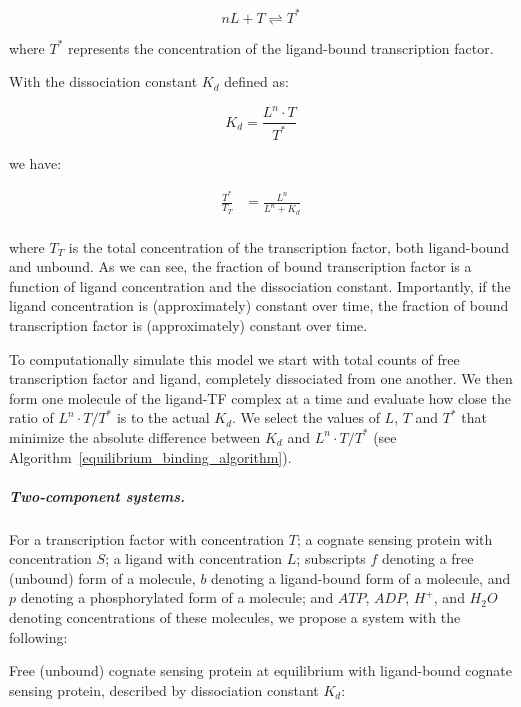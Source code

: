 \documentclass[12pt]{article}
\begin{document}
\begin{equation}
nL + T \rightleftharpoons T^*
\end{equation}

\noindent where \(T^*\) represents the concentration of the ligand-bound transcription factor.

With the dissociation constant \(K_d\) defined as:

\begin{equation}
K_d = \frac{L^n \cdot T}{T^*}
\end{equation}

\noindent we have:

\begin{equation}
\begin{aligned}
\frac{T^*}{T_T} &= \frac{L^n}{L^n + K_d} \\
\end{aligned}
\label{eq:transcription_1cs}
\end{equation}

\noindent where $T_T$ is the total concentration of the transcription factor, both ligand-bound and unbound. As we can see, the fraction of bound transcription factor is a function of ligand concentration and the dissociation constant.  Importantly, if the ligand concentration is (approximately) constant over time, the fraction of bound transcription factor is (approximately) constant over time.

To computationally simulate this model we start with total counts of free transcription factor and ligand, completely dissociated from one another.  We then form one molecule of the ligand-TF complex at a time and evaluate how close the ratio of \(L^n \cdot T / T^*\) is to the actual \(K_d\).  We select the values of \(L\), \(T\) and \(T^*\) that minimize the absolute difference between \(K_d\) and \(L^n \cdot T / T^*\) (see Algorithm~\ref{equilibrium_binding_algorithm}).

\subparagraph{Two-component systems.}
For a transcription factor with concentration \(T\); a cognate sensing protein with concentration \(S\); a ligand with concentration \(L\); subscripts \(f\) denoting a free (unbound) form of a molecule, \(b\) denoting a ligand-bound form of a molecule, and \(p\) denoting a phosphorylated form of a molecule; and \(ATP\), \(ADP\), \(H^+\), and \(H_2O\) denoting concentrations of these molecules, we propose a system with the following:

Free (unbound) cognate sensing protein at equilibrium with ligand-bound cognate sensing protein, described by dissociation constant \(K_d\):
\end{document}
